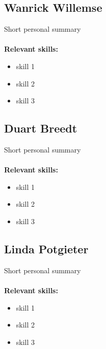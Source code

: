 \documentclass[12pt,a4paper]{article}
\begin{document}
		\subsection{Wanrick Willemse}
		Short personal summary\\\\
		\textbf{\small Relevant skills:}
		\begin{itemize}
			\item skill 1
			\item skill 2
			\item skill 3
		\end{itemize}
		
	
		\subsection{Duart Breedt}
		Short personal summary\\\\
		\textbf{\small Relevant skills:}
		\begin{itemize}
			\item skill 1
			\item skill 2
			\item skill 3
		\end{itemize}
		
		
		\subsection{Linda Potgieter}
		Short personal summary\\\\
		\textbf{\small Relevant skills:}
		\begin{itemize}
			\item skill 1
			\item skill 2
			\item skill 3
		\end{itemize}
\end{document}
